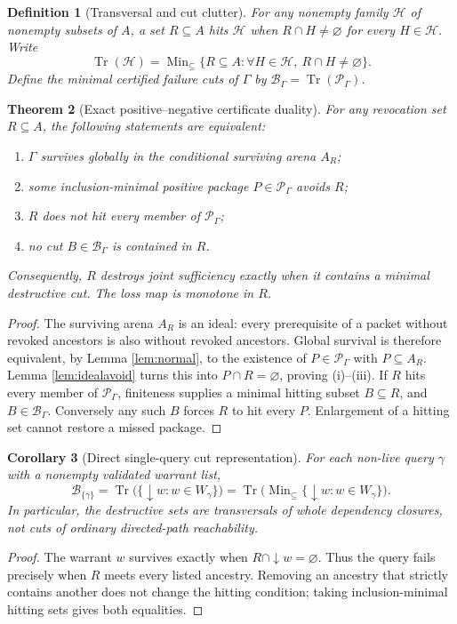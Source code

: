 \documentclass[11pt,letterpaper]{article}
\newtheorem{theorem}{Theorem}[section]
\newtheorem{corollary}[theorem]{Corollary}
\newtheorem{definition}[theorem]{Definition}
\DeclareMathOperator{\Min}{Min}
\DeclareMathOperator{\Tr}{Tr}
\newcommand{\calP}{\mathcal P}
\newcommand{\calB}{\mathcal B}
\newcommand{\Gam}{\Gamma}
\begin{document}
\begin{definition}[Transversal and cut clutter]\label{def:transversal}
For any nonempty family $\mathcal H$ of nonempty subsets of $A$, a set $R\subseteq A$ \emph{hits} $\mathcal H$ when $R\cap H\ne\varnothing$ for every $H\in\mathcal H$. Write
\[
\Tr(\mathcal H)=\Min_{\subseteq}\{R\subseteq A:\forall H\in\mathcal H,\ R\cap H\ne\varnothing\}.
\]
Define the \emph{minimal certified failure cuts} of $\Gam$ by $\calB_\Gam=\Tr(\calP_\Gam)$.
\end{definition}

\begin{theorem}[Exact positive--negative certificate duality]\label{thm:duality}
For any revocation set $R\subseteq A$, the following statements are equivalent:
\begin{enumerate}[label=(\roman*)]
\item $\Gam$ survives globally in the conditional surviving arena $A_R$;
\item some inclusion-minimal positive package $P\in\calP_\Gam$ avoids $R$;
\item $R$ does not hit every member of $\calP_\Gam$;
\item no cut $B\in\calB_\Gam$ is contained in $R$.
\end{enumerate}
Consequently, $R$ destroys joint sufficiency exactly when it contains a minimal destructive cut. The loss map is monotone in $R$.
\end{theorem}
\begin{proof}
The surviving arena $A_R$ is an ideal: every prerequisite of a packet without revoked ancestors is also without revoked ancestors. Global survival is therefore equivalent, by Lemma \ref{lem:normal}, to the existence of $P\in\calP_\Gam$ with $P\subseteq A_R$. Lemma \ref{lem:idealavoid} turns this into $P\cap R=\varnothing$, proving (i)--(iii). If $R$ hits every member of $\calP_\Gam$, finiteness supplies a minimal hitting subset $B\subseteq R$, and $B\in\calB_\Gam$. Conversely any such $B$ forces $R$ to hit every $P$. Enlargement of a hitting set cannot restore a missed package.
\end{proof}

\begin{corollary}[Direct single-query cut representation]\label{cor:singlecuts}
For each non-live query $\gamma$ with a nonempty validated warrant list,
\[
\calB_{\{\gamma\}}=
\Tr\bigl(\{\downarrow w:w\in W_\gamma\}\bigr)
=\Tr\bigl(\Min_{\subseteq}\{\downarrow w:w\in W_\gamma\}\bigr).
\tag{3a}\label{eq:singlecuts}
\]
In particular, the destructive sets are transversals of \emph{whole dependency closures}, not cuts of ordinary directed-path reachability.
\end{corollary}
\begin{proof}
The warrant $w$ survives exactly when $R\cap\downarrow w=\varnothing$. Thus the query fails precisely when $R$ meets every listed ancestry. Removing an ancestry that strictly contains another does not change the hitting condition; taking inclusion-minimal hitting sets gives both equalities.
\end{proof}
\end{document}
